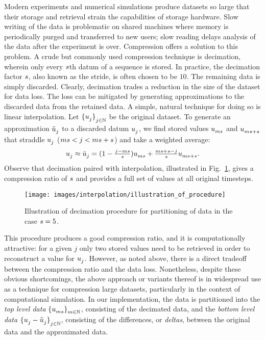 

Modern experiments and numerical simulations produce datasets so large that their storage and retrieval strain the capabilities of storage hardware.
Slow writing of the data is problematic on shared machines where memory is periodically purged and transferred to new users; slow reading delays analysis of the data after the experiment is over.
Compression offers a solution to this problem.
A crude but commonly used compression technique is decimation, wherein only every \(s\)th datum of a sequence is stored.
In practice, the decimation factor \(s\), also known as the stride, is often chosen to be \(10\).
The remaining data is simply discarded.
Clearly, decimation trades a reduction in the size of the dataset for data loss.
The loss can be mitigated by generating approximations to the discarded data from the retained data.
A simple, natural technique for doing so is linear interpolation.
Let \(\Data\) be the original dataset.
To generate an approximation \(\Datum[approx]{j}\) to a discarded datum \(\Datum{j}\), we find stored values \(\Datum{m\stride}\) and \(\Datum{m\stride+\stride}\) that straddle \(\Datum{j}\) (\(ms<j<ms+s\)) and take a weighted average:
\begin{equation*}
\Datum{j} \approx \Datum[approx]{j} = (1-\tfrac{j-m\stride}{\stride})\Datum{m\stride}+\tfrac{m\stride+\stride-j}{\stride}\Datum{m\stride+\stride}
.
\end{equation*}
Observe that decimation paired with interpolation, illustrated in Fig.~\ref{fig:InterpolationReconstructionOfDiscardedValues}, gives a compression ratio of \(s\) and provides a full set of values at all original timesteps.
\begin{figure}[ht]
\centering
\texttt{[image: images/interpolation/illustration\_of\_procedure]}
\caption{Illustration of decimation procedure for partitioning of data in the case \(s=5\).}
\label{fig:InterpolationReconstructionOfDiscardedValues}
\end{figure}
This procedure produces a good compression ratio, and it is computationally attractive: for a given \(j\) only two stored values need to be retrieved in order to reconstruct a value for \(\Datum{j}\).
However, as noted above, there is a direct tradeoff between the compression ratio and the data loss.
Nonetheless, despite these obvious shortcomings, the above approach or variants thereof is in widespread use as a technique for compression large datasets, particularly in the context of computational simulation.
In our implementation, the data is partitioned into the \emph{top level data} \(\DataDecimated\), consisting of the decimated data, and the \emph{bottom level data} \(\InterpolationErrors\), consisting of the differences, or \emph{deltas}, between the original data and the approximated data.

